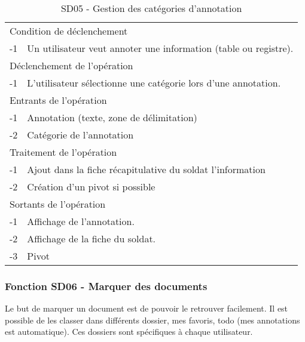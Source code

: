 \documentclass[a4paper]{article}
\begin{document}
\begin{table}[H]
  \centering
   \small
	\begin{tabular}{|c|p{12cm}|}
   		\hline
   			\rowcolor{lightgray}\multicolumn{2}{|c|}{\textbf{SD05 - Gestion des cat\'egories d'annotation}} \\
   		\hline
   			\multicolumn{2}{|l|}{Condition de d\'eclenchement} \\
   		\hline
   		-1 & Un utilisateur veut annoter une information (table ou registre). \\
   		\hline
   			\multicolumn{2}{|l|}{D\'eclenchement de l'op\'eration} \\
   		\hline
   			-1 & L'utilisateur s\'electionne une cat\'egorie lors d'une annotation. \\
   		\hline
   			\multicolumn{2}{|l|}{Entrants de l'op\'eration} \\
   		\hline
   			-1 & Annotation (texte, zone de d\'elimitation)\\
        	-2 & Cat\'egorie de l'annotation \\
   		\hline
   			\multicolumn{2}{|l|}{Traitement de l'op\'eration} \\
  		\hline
   			-1 & Ajout dans la fiche r\'ecapitulative du soldat l'information \\
        	-2 & Cr\'eation d'un pivot si possible \\
   		\hline
   			\multicolumn{2}{|l|}{Sortants de l'op\'eration} \\
   		\hline
   			-1 & Affichage de l'annotation. \\
            -2 & Affichage de la fiche du soldat. \\
            -3 & Pivot \\
   		\hline
	\end{tabular}
  \caption{SD05 - Gestion des cat\'egories d'annotation}
  \normalsize
  \label{tab:gestion_categorie}
\end{table}


\subsubsection{Fonction SD06 - Marquer des documents}


Le but de marquer un document est de pouvoir le retrouver facilement. Il est possible de les classer dans différents dossier, mes favoris, todo (mes annotations est automatique). Ces dossiers sont sp\'ecifiques \`a chaque utilisateur.\\
\end{document}

